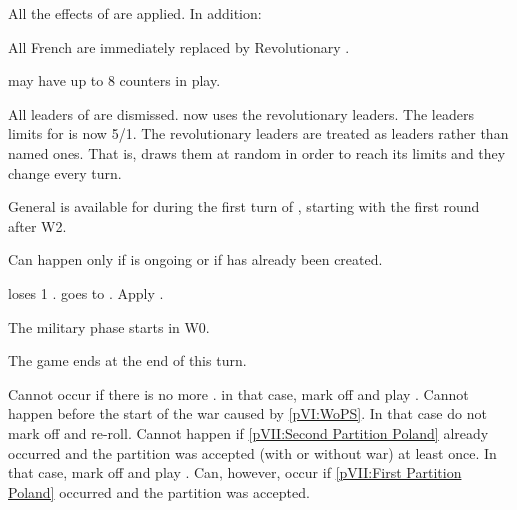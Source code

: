 \begin{digressions}
  All the effects of  are applied. In
  addition:

  \phdipl
  \aparag All French \ARMY are immediately replaced by Revolutionary \ARMY.

  \aparag \FRA may have up to 8 \ARMY counters in play.

  \bparag All leaders of \FRA are dismissed. \FRA now uses the revolutionary
  leaders.
  \bparag The leaders limits for \FRA is now 5\LeaderG/1\LeaderA.
  \bparag The revolutionary leaders are treated as \anonyme leaders rather
  than named ones. That is, \FRA draws them at random in order to reach
  its limits and they change every turn.

  \aparag General  is available for \FRA during the
  first turn of \monarqueTerror, starting with the first round after
  W2. %
\end{digressions}



\condition{}
\aparag Can happen only if  is ongoing or if
\paysusa has already been created.

\phevnt
\aparag \FRA loses 1 \STAB.
\aparag \FRA goes to \monarqueTerror. Apply
.

\phmil
\aparag The military phase starts in W0.

\phpaix
\aparag The game ends at the end of this turn.





\condition{}
\aparag Cannot occur if there is no more \payspologne. in that case, mark off
and play \RD.
\aparag Cannot happen before the start of the war caused by \ref{pVI:WoPS}. In
that case do not mark off and re-roll.
\aparag Cannot happen if \ref{pVII:Second Partition Poland} already occurred
and the partition was accepted (with or without war) at least once. In that
case, mark off and play \RD.
\bparag Can, however, occur if \ref{pVII:First Partition Poland} occurred and
the partition was accepted.

